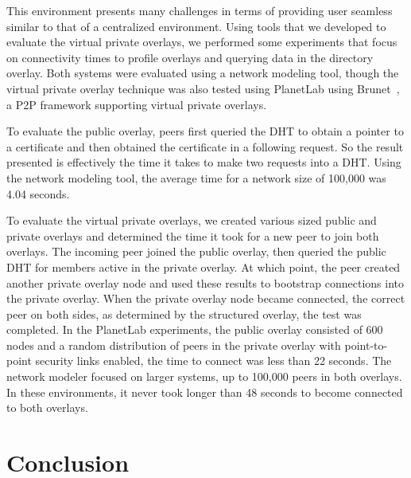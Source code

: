 \documentclass{IEEEtran}
\begin{document}
This environment presents many challenges in terms of providing user seamless
similar to that of a centralized environment.  Using tools that we developed
to evaluate the virtual private overlays, we performed some experiments that
focus on connectivity times to profile overlays and querying data in the
directory overlay.  Both systems were evaluated using a network modeling tool,
though the virtual private overlay technique was also tested using PlanetLab
using Brunet~\cite{brunet}, a P2P framework supporting virtual private overlays.

To evaluate the public overlay, peers first queried the DHT to obtain a pointer
to a certificate and then obtained the certificate in a following request.  So
the result presented is effectively the time it takes to make two requests into
a DHT.  Using the network modeling tool, the average time for a network size of
100,000 was 4.04 seconds.

To evaluate the virtual private overlays, we created various sized public and
private overlays and determined the time it took for a new peer to join both
overlays.  The incoming peer joined the public overlay, then queried the public
DHT for members active in the private overlay.  At which point, the peer
created another private overlay node and used these results to bootstrap
connections into the private overlay.  When the private overlay node became
connected, the correct peer on both sides, as determined by the structured
overlay, the test was completed.  In the PlanetLab experiments, the public
overlay consisted of 600 nodes and a random distribution of peers in the
private overlay with point-to-point security links enabled, the time to connect
was less than 22 seconds.  The network modeler focused on larger systems, up to
100,000 peers in both overlays.  In these environments, it never took longer
than 48 seconds to become connected to both overlays.

\section{Conclusion}
\label{conclusion}
\end{document}
